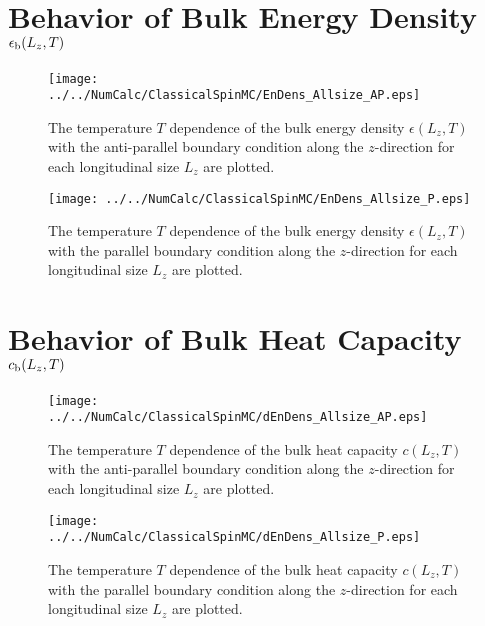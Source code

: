 \section{Behavior of Bulk Energy Density $\epsilon_{\rm b}(L_{z}, T)$}
\begin{figure}[htbp]
	\centering
	\texttt{[image: ../../NumCalc/ClassicalSpinMC/EnDens\_Allsize\_AP.eps]}
	\caption{The temperature $T$ dependence of the bulk energy density $\epsilon(L_{z}, T)$ with the anti-parallel boundary condition along the $z$-direction for each longitudinal size $L_{z}$ are plotted.}
\end{figure}
\begin{figure}[htbp]
	\centering
	\texttt{[image: ../../NumCalc/ClassicalSpinMC/EnDens\_Allsize\_P.eps]}
	\caption{The temperature $T$ dependence of the bulk energy density $\epsilon(L_{z}, T)$ with the parallel boundary condition along the $z$-direction for each longitudinal size $L_{z}$ are plotted.}
\end{figure}
\pagebreak

\section{Behavior of Bulk Heat Capacity $c_{\rm b}(L_{z}, T)$}
\begin{figure}[htbp]
	\centering
	\texttt{[image: ../../NumCalc/ClassicalSpinMC/dEnDens\_Allsize\_AP.eps]}
	\caption{The temperature $T$ dependence of the bulk heat capacity $c(L_{z}, T)$ with the anti-parallel boundary condition along the $z$-direction for each longitudinal size $L_{z}$ are plotted.}
\end{figure}
\begin{figure}[htbp]
	\centering
	\texttt{[image: ../../NumCalc/ClassicalSpinMC/dEnDens\_Allsize\_P.eps]}
	\caption{The temperature $T$ dependence of the bulk heat capacity $c(L_{z}, T)$ with the parallel boundary condition along the $z$-direction for each longitudinal size $L_{z}$ are plotted.}
\end{figure}
\pagebreak
